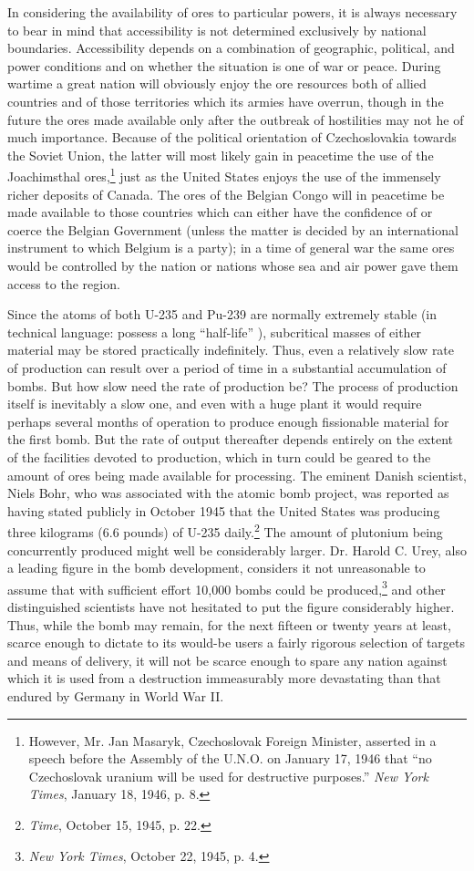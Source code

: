 In considering the availability of ores to particular powers, it is always necessary to bear in mind that accessibility is not determined exclusively by national boundaries. Accessibility depends on a combination of geographic, political, and power conditions and on whether the situation is one of war or peace. During wartime a great nation will obviously enjoy the ore resources both of allied countries and of those territories which its armies have overrun, though in the future the ores made available only after the outbreak of hostilities may not he of much importance. Because of the political orientation of Czechoslovakia towards the Soviet Union, the latter will most likely gain in peacetime the use of the Joachimsthal ores,\footnote{However, Mr. Jan Masaryk, Czechoslovak Foreign Minister, asserted in a speech before the Assembly of the U.N.O. on January 17, 1946 that ``no Czechoslovak uranium will be used for destructive purposes.'' \textit{New York Times}, January 18, 1946, p. 8.} just as the United States enjoys the use of the immensely richer deposits of Canada. The ores of the Belgian Congo will in peacetime be made available to those countries which can either have the confidence of or coerce the Belgian Government (unless the matter is decided by an international instrument to which Belgium is a party); in a time of general war the same ores would be controlled by the nation or nations whose sea and air power gave them access to the region.

Since the atoms of both U-235 and Pu-239 are normally extremely stable (in technical language: possess a long ``half-life'' ), subcritical masses of either material may be stored practically indefinitely. Thus, even a relatively slow rate of production can result over a period of time in a substantial accumulation of bombs. But how slow need the rate of production be? The process of production itself is inevitably a slow one, and even with a huge plant it would require perhaps several months of operation to produce enough fissionable material for the first bomb. But the rate of output thereafter depends entirely on the extent of the facilities devoted to production, which in turn could be geared to the amount of ores being made available for processing. The eminent Danish scientist, Niels Bohr, who was associated with the atomic bomb project, was reported as having stated publicly in October 1945 that the United States was producing three kilograms (6.6 pounds) of U-235 daily.\footnote{\emph{Time}, October 15, 1945, p. 22.} The amount of plutonium being concurrently produced might well be considerably larger. Dr. Harold C. Urey, also a leading figure in the bomb development, considers it not unreasonable to assume that with sufficient effort 10,000 bombs could be produced,\footnote{\textit{New York Times}, October 22, 1945, p. 4.} and other distinguished scientists have not hesitated to put the figure considerably higher. Thus, while the bomb may remain, for the next fifteen or twenty years at least, scarce enough to dictate to its would-be users a fairly rigorous selection of targets and means of delivery, it will not be scarce enough to spare any nation against which it is used from a destruction immeasurably more devastating than that endured by Germany in World War II.

